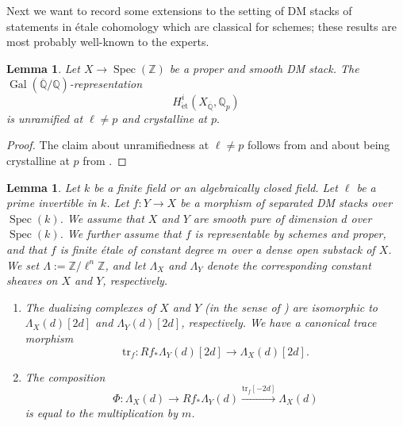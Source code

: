 \documentclass{amsart}
\newtheorem{lem}[prop]{Lemma}
\theoremstyle{definition}
\theoremstyle{remark}
\DeclareMathOperator{\Gal}{Gal}
\DeclareMathOperator{\Spec}{Spec}
\newcommand{\Q}{\mathbb{Q}}
\newcommand{\ZZ}{\mathbb Z}
\newcommand{\et}{\operatorname{\acute{e}t}}%
\begin{document}
Next we want to record some extensions to the setting of DM stacks of statements in étale cohomology which are classical for schemes; these results are most probably well-known to the experts.

\begin{lem}\label{lem: Galois rep is everywhere unramified and crystalline at p}
    Let $X\rightarrow \Spec(\ZZ)$ be a proper and smooth DM stack.
    The $\Gal(\overline{\Q}/\Q)$-representation 
    $$
    H^{i}_{\et}(X_{\overline{\Q}},\mathbb{Q}_{p})
    $$
    is unramified at $\ell\neq p$ and crystalline at $p.$
\end{lem}
\begin{proof}
    The claim about unramifiedness at $\ell\neq p$ follows from \cite[Proposition 3.1]{BogaartEdixhoven} and about being crystalline at $p$ from \cite[Theorem 4.3.25, Remark 4.1.15]{KubrakPrikhodkopHodgeStacks}.
\end{proof}


\begin{lem}\label{lem: trace morphism for generically finite etale morphism}
Let $k$ be a finite field or an algebraically closed field.
Let $\ell$ be a prime invertible in $k$.
Let $f \colon Y \to X$ be a morphism of separated DM stacks over $\Spec (k)$.
We assume that $X$ and $Y$ are smooth pure of dimension $d$ over $\Spec (k)$.
We further assume that $f$ is representable by schemes and proper, and that $f$ is finite \'etale of constant degree $m$ over a dense open substack of $X$.
We set $\Lambda :=\ZZ/\ell^n \ZZ$, and let $\Lambda_X$ and $\Lambda_Y$ denote the corresponding constant sheaves on $X$ and $Y$, respectively.
\begin{enumerate}
    \item The dualizing complexes of $X$ and $Y$ (in the sense of \cite{Laszlo-Olsson}) are isomorphic to
    $\Lambda_X(d)[2d]$ and 
    $\Lambda_Y(d)[2d]$, respectively.
    We have a canonical trace morphism
    \[
    \mathrm{tr}_f \colon R f_* \Lambda_Y(d)[2d] \to \Lambda_X(d)[2d].
    \]
    \item The composition
\[
\Phi \colon \Lambda_X(d) \to
R f_*\Lambda_Y(d)
\overset{\mathrm{tr}_f[-2d]}{\longrightarrow} \Lambda_X(d)
\]
is equal to the multiplication by $m$.
\end{enumerate}
\end{lem}
\end{document}
